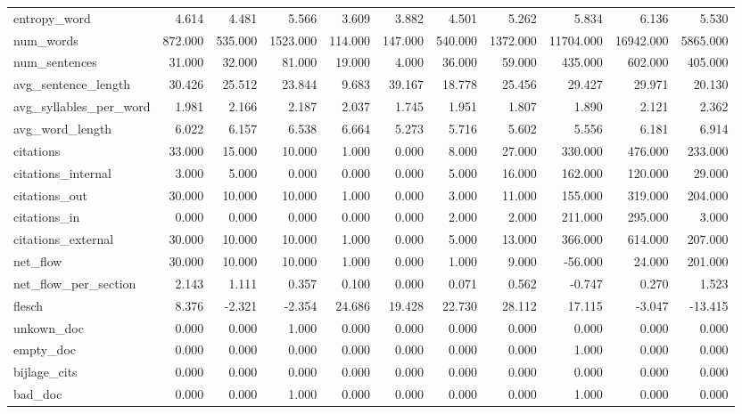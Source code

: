 \begin{tabular}{lrrrrrrrrrr}
\cline{1-11}
entropy\_word & 4.614 & 4.481 & 5.566 & 3.609 & 3.882 & 4.501 & 5.262 & 5.834 & 6.136 & 5.530 \\
\cline{1-11}
num\_words & 872.000 & 535.000 & 1523.000 & 114.000 & 147.000 & 540.000 & 1372.000 & 11704.000 & 16942.000 & 5865.000 \\
\cline{1-11}
num\_sentences & 31.000 & 32.000 & 81.000 & 19.000 & 4.000 & 36.000 & 59.000 & 435.000 & 602.000 & 405.000 \\
\cline{1-11}
avg\_sentence\_length & 30.426 & 25.512 & 23.844 & 9.683 & 39.167 & 18.778 & 25.456 & 29.427 & 29.971 & 20.130 \\
\cline{1-11}
avg\_syllables\_per\_word & 1.981 & 2.166 & 2.187 & 2.037 & 1.745 & 1.951 & 1.807 & 1.890 & 2.121 & 2.362 \\
\cline{1-11}
avg\_word\_length & 6.022 & 6.157 & 6.538 & 6.664 & 5.273 & 5.716 & 5.602 & 5.556 & 6.181 & 6.914 \\
\cline{1-11}
citations & 33.000 & 15.000 & 10.000 & 1.000 & 0.000 & 8.000 & 27.000 & 330.000 & 476.000 & 233.000 \\
\cline{1-11}
citations\_internal & 3.000 & 5.000 & 0.000 & 0.000 & 0.000 & 5.000 & 16.000 & 162.000 & 120.000 & 29.000 \\
\cline{1-11}
citations\_out & 30.000 & 10.000 & 10.000 & 1.000 & 0.000 & 3.000 & 11.000 & 155.000 & 319.000 & 204.000 \\
\cline{1-11}
citations\_in & 0.000 & 0.000 & 0.000 & 0.000 & 0.000 & 2.000 & 2.000 & 211.000 & 295.000 & 3.000 \\
\cline{1-11}
citations\_external & 30.000 & 10.000 & 10.000 & 1.000 & 0.000 & 5.000 & 13.000 & 366.000 & 614.000 & 207.000 \\
\cline{1-11}
net\_flow & 30.000 & 10.000 & 10.000 & 1.000 & 0.000 & 1.000 & 9.000 & -56.000 & 24.000 & 201.000 \\
\cline{1-11}
net\_flow\_per\_section & 2.143 & 1.111 & 0.357 & 0.100 & 0.000 & 0.071 & 0.562 & -0.747 & 0.270 & 1.523 \\
\cline{1-11}
flesch & 8.376 & -2.321 & -2.354 & 24.686 & 19.428 & 22.730 & 28.112 & 17.115 & -3.047 & -13.415 \\
\cline{1-11}
unkown\_doc & 0.000 & 0.000 & 1.000 & 0.000 & 0.000 & 0.000 & 0.000 & 0.000 & 0.000 & 0.000 \\
\cline{1-11}
empty\_doc & 0.000 & 0.000 & 0.000 & 0.000 & 0.000 & 0.000 & 0.000 & 1.000 & 0.000 & 0.000 \\
\cline{1-11}
bijlage\_cits & 0.000 & 0.000 & 0.000 & 0.000 & 0.000 & 0.000 & 0.000 & 0.000 & 0.000 & 0.000 \\
\cline{1-11}
bad\_doc & 0.000 & 0.000 & 1.000 & 0.000 & 0.000 & 0.000 & 0.000 & 1.000 & 0.000 & 0.000 \\
\cline{1-11}
\bottomrule
\end{tabular}
